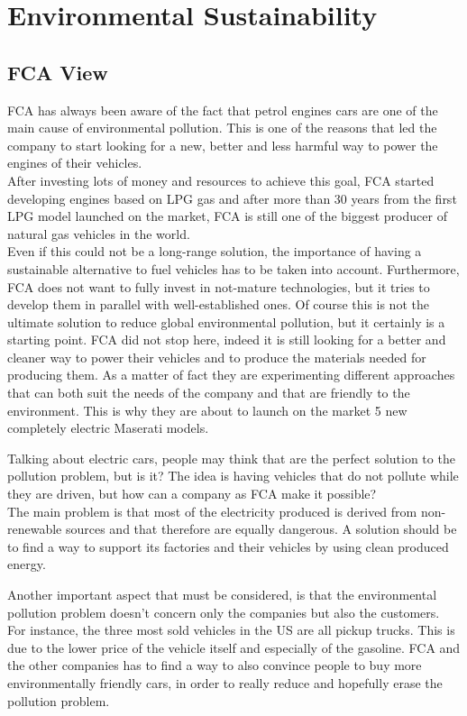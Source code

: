 \section{Environmental Sustainability}
\subsection{FCA View}
FCA has always been aware of the fact that petrol engines cars are one of the main cause of environmental pollution. This is one of the reasons that led the company to start looking for a new, better and less harmful way to power the engines of their vehicles.\\
After investing lots of money and resources to achieve this goal, FCA started developing engines based on LPG gas and after more than 30 years from the first LPG model launched on the market, FCA is still one of the biggest producer of natural gas vehicles in the world\cite{FCA_sustainability}.\\
Even if this could not be a long-range solution, the importance of having a sustainable alternative to fuel vehicles has to be taken into account. Furthermore, FCA does not want to fully invest in not-mature technologies, but it tries to develop them in parallel with well-established ones.
Of course this is not the ultimate solution to reduce global environmental pollution, but it certainly is a starting point. FCA did not stop here, indeed it is still looking for a better and cleaner way to power their vehicles and to produce the materials needed for producing them. As a matter of fact they are experimenting different approaches that can both suit the needs of the company and that are friendly to the environment. This is why they are about to launch on the market 5 new completely electric Maserati models\cite{Maserati_electric}.

Talking about electric cars, people may think that are the perfect solution to the pollution problem, but is it?
The idea is having vehicles that do not pollute while they are driven, but how can a company as FCA make it possible?\\
The main problem is that most of the electricity produced is derived from non-renewable sources and that therefore are equally dangerous. A solution should be to find a way to support its factories and their vehicles by using clean produced energy.

Another important aspect that must be considered, is that the environmental pollution problem doesn't concern only the companies but also the customers. For instance, the three most sold vehicles in the US are all pickup trucks\cite{US_best-selling-vehicle}. This is due to the lower price of the vehicle itself and especially of the gasoline. 
FCA and the other companies has to find a way to also convince people to buy more environmentally friendly cars, in order to really reduce and hopefully erase the pollution problem.

